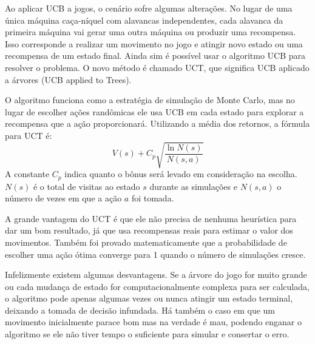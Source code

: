 Ao aplicar UCB a jogos, o cenário sofre algumas alterações. No lugar de uma única máquina caça-níquel com alavancas independentes, cada alavanca da primeira máquina vai gerar uma outra máquina ou produzir uma recompensa. Isso corresponde a realizar um movimento no jogo e atingir novo estado ou uma recompensa de um estado final. Ainda sim é possível usar o algoritmo UCB para resolver o problema. O novo método é chamado UCT\cite{uct}, que significa UCB aplicado a árvores (UCB applied to Trees). 

O algoritmo funciona como a estratégia de simulação de Monte Carlo, mas no lugar de escolher ações randômicas ele usa UCB em cada estado para explorar a recompensa que a ação proporcionará. Utilizando a média dos retornos, a fórmula para UCT é:
\begin{equation}
V(s) + C_{p}\sqrt{\frac{\ln N(s)}{N(s,a)}}
\end{equation}
A constante $C_{p}$ indica quanto o bônus será levado em consideração na escolha. $N(s)$ é o total de visitas ao estado $s$ durante as simulações e $N(s,a)$ o número de vezes em que a ação $a$ foi tomada.

A grande vantagem do UCT é que ele não precisa de nenhuma heurística para dar um bom resultado, já que usa recompensas reais para estimar o valor dos movimentos. Também foi provado matematicamente que a probabilidade de escolher uma ação ótima converge para 1 quando o número de simulações cresce. 

Infelizmente existem algumas desvantagens. Se a árvore do jogo for muito grande ou cada mudança de estado for computacionalmente complexa para ser calculada, o algoritmo pode apenas algumas vezes ou nunca atingir um estado terminal, deixando a tomada de decisão infundada. Há também o caso em que um movimento inicialmente parace bom mas na verdade é mau, podendo enganar o algoritmo se ele não tiver tempo o suficiente para simular e consertar o erro. 